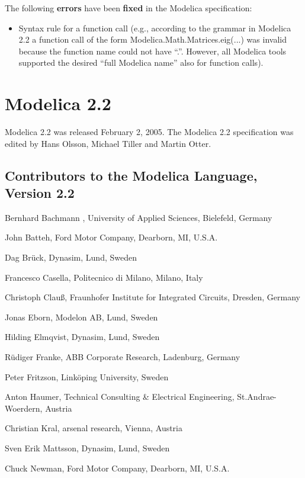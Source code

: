 \documentclass[10pt,a4paper]{report}
\def\doublelabel#1{\label{#1}\hypertarget{#1}{}}
\begin{document}
The following \textbf{errors} have been \textbf{fixed} in the Modelica
specification:

\begin{itemize}
\item
  Syntax rule for a function call (e.g., according to the grammar in
  Modelica 2.2 a function call of the form
  Modelica.Math.Matrices.eig(...) was invalid because the function name
  could not have ``.''. However, all Modelica tools supported the
  desired ``full Modelica name'' also for function calls).
\end{itemize}

\section{Modelica 2.2}\doublelabel{modelica-2-2}

Modelica 2.2 was released February 2, 2005. The Modelica 2.2
specification was edited by Hans Olsson, Michael Tiller and Martin
Otter.

\subsection{Contributors to the Modelica Language, Version 2.2}\doublelabel{contributors-to-the-modelica-language-version-2-2}

Bernhard Bachmann , University of Applied Sciences, Bielefeld, Germany

John Batteh, Ford Motor Company, Dearborn, MI, U.S.A.

Dag Brück, Dynasim, Lund, Sweden

Francesco Casella, Politecnico di Milano, Milano, Italy

Christoph Clauß, Fraunhofer Institute for Integrated Circuits, Dresden,
Germany

Jonas Eborn, Modelon AB, Lund, Sweden

Hilding Elmqvist, Dynasim, Lund, Sweden

Rüdiger Franke, ABB Corporate Research, Ladenburg, Germany

Peter Fritzson, Linköping University, Sweden

Anton Haumer, Technical Consulting \& Electrical Engineering,
St.Andrae-Woerdern, Austria

Christian Kral, arsenal research, Vienna, Austria

Sven Erik Mattsson, Dynasim, Lund, Sweden

Chuck Newman, Ford Motor Company, Dearborn, MI, U.S.A.
\end{document}
